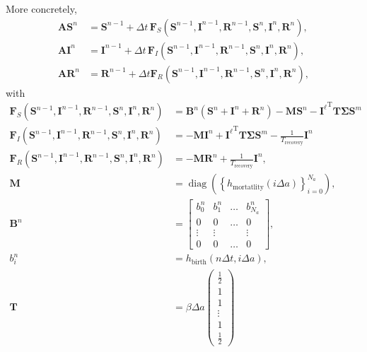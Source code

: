 \documentclass{article}
\renewcommand{\vec}[1]{\mathbf{#1}}
\newcommand{\mat}[1]{\mathbf{#1}}
\newcommand{\mT}{\mathrm{T}}
\DeclareMathOperator{\diag}{diag}
\begin{document}
More concretely,
\begin{equation}
  \begin{split}
    \mat{A} \vec{S}^n
    &=
    \vec{S}^{n - 1}
    + \Delta t \, 
    \mat{F}_S(\vec{S}^{n - 1}, \vec{I}^{n - 1}, \vec{R}^{n - 1},
    \vec{S}^n, \vec{I}^n, \vec{R}^n),
    \\
    \mat{A} \vec{I}^n
    &=
    \vec{I}^{n - 1}
    + \Delta t \,
    \mat{F}_I(\vec{S}^{n - 1}, \vec{I}^{n - 1}, \vec{R}^{n - 1},
    \vec{S}^n, \vec{I}^n, \vec{R}^n),
    \\
    \mat{A} \vec{R}^n
    &=
    \vec{R}^{n - 1}
    + \Delta t \mat{F}_R(\vec{S}^{n - 1}, \vec{I}^{n - 1}, \vec{R}^{n - 1},
    \vec{S}^n, \vec{I}^n, \vec{R}^n),
  \end{split}
\end{equation}
with
\begin{equation}
  \begin{split}
    \vec{F}_S(\vec{S}^{n - 1}, \vec{I}^{n - 1}, \vec{R}^{n - 1},
    \vec{S}^n, \vec{I}^n, \vec{R}^n)
    &= \mat{B}^n (\vec{S}^n + \vec{I}^n + \vec{R}^n)
    - \mat{M} \vec{S}^n
    - {\vec{I}^{\ell}}^{\mT} \vec{T} \mat{\Sigma} \vec{S}^m
    \\
    \vec{F}_I(\vec{S}^{n - 1}, \vec{I}^{n - 1}, \vec{R}^{n - 1},
    \vec{S}^n, \vec{I}^n, \vec{R}^n)
    &= - \mat{M} \vec{I}^n
    + {\vec{I}^{\ell}}^{\mT} \vec{T} \mat{\Sigma} \vec{S}^m
    - \frac{1}{T_{\text{recovery}}} \vec{I}^n
    \\
    \vec{F}_R(\vec{S}^{n - 1}, \vec{I}^{n - 1}, \vec{R}^{n - 1},
    \vec{S}^n, \vec{I}^n, \vec{R}^n)
    &= - \mat{M} \vec{R}^n + \frac{1}{T_{\text{recovery}}} \vec{I}^n,
    \\
    \mat{M} &= \diag\left(\left\{h_{\text{mortatlity}}(i \Delta
        a)\right\}_{i = 0}^{N_a}\right),
    \\
    \mat{B}^n &=
    \begin{bmatrix}
      b^n_0
      &
      b^n_1
      &
      \hdots
      &
      b^n_{N_a}
      \\
      0 & 0 & \hdots & 0
      \\
      \vdots & \vdots & & \vdots
      \\
      0 & 0 & \hdots & 0
    \end{bmatrix},
    \\
    b^n_i &= h_{\text{birth}}(n \Delta t, i \Delta a),
    \\
    \vec{T} &= \beta \Delta a
    \begin{pmatrix}
      \frac{1}{2} \\ 1 \\ 1 \\ \vdots \\ 1 \\ \frac{1}{2}

\end{pmatrix}
\end{split}
\end{equation}
\end{document}
